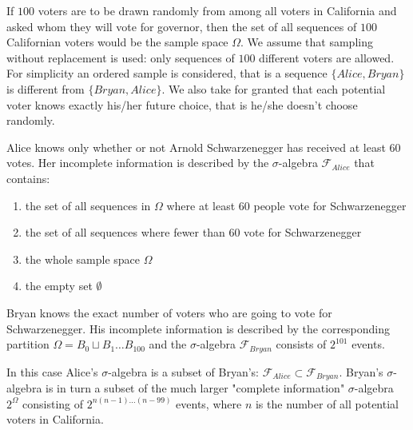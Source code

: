 \documentclass{article}
\begin{document}
      \begin{example}[Voters]
        If $100$ voters are to be drawn randomly from among all voters in California and asked whom they will vote for governor, then the set of all sequences of $100$ Californian voters would be the sample space $\Omega$. We assume that sampling without replacement is used: only sequences of $100$ different voters are allowed. For simplicity an ordered sample is considered, that is a sequence $\{Alice, Bryan\}$ is different from $\{Bryan, Alice\}$. We also take for granted that each potential voter knows exactly his/her future choice, that is he/she doesn’t choose randomly.

        Alice knows only whether or not Arnold Schwarzenegger has received at least $60$ votes. Her incomplete information is described by the $\sigma$-algebra $\mathcal{F}_{Alice}$ that contains:
        \begin{enumerate}
          \item the set of all sequences in $\Omega$ where at least $60$ people vote for Schwarzenegger
          \item the set of all sequences where fewer than $60$ vote for Schwarzenegger
          \item the whole sample space $\Omega$
          \item the empty set $\emptyset$
        \end{enumerate}
        Bryan knows the exact number of voters who are going to vote for Schwarzenegger. His incomplete information is described by the corresponding partition $\Omega = B_0 \sqcup B_1 \ldots B_{100}$ and the $\sigma$-algebra $\mathcal{F}_{Bryan}$ consists of $2^{101}$ events. 

        In this case Alice’s $\sigma$-algebra is a subset of Bryan’s: $\mathcal{F}_{Alice} \subset \mathcal{F}_{Bryan}$. Bryan’s $\sigma$-algebra is in turn a subset of the much larger "complete information" $\sigma$-algebra $2^{\Omega}$ consisting of $2^{n(n-1)\ldots (n-99)}$ events, where $n$ is the number of all potential voters in California. 
      \end{example}
\end{document}
